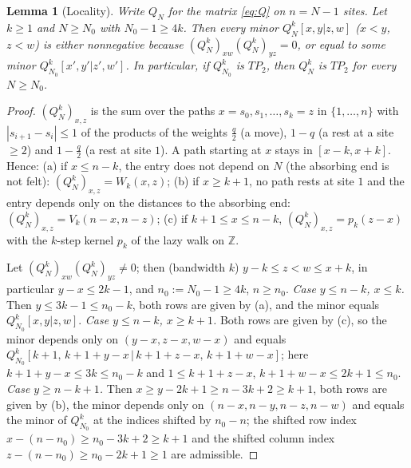 \documentclass[11pt,a4paper]{article}
\newtheorem{lemma}[theorem]{Lemma}
\theoremstyle{definition}
\theoremstyle{remark}
\newcommand{\Z}{\mathbb{Z}}
\begin{document}
\begin{lemma}[Locality]\label{lem:local}
Write $Q_N$ for the matrix \eqref{eq:Q} on $n=N-1$ sites. Let $k\ge1$ and $N\ge N_0$ with $N_0-1\ge4k$. Then every
minor $Q_N^k[x,y|z,w]$ ($x<y$, $z<w$) is either nonnegative because $(Q_N^k)_{xw}(Q_N^k)_{yz}=0$, or equal to some
minor $Q_{N_0}^k[x',y'|z',w']$. In particular, if $Q_{N_0}^k$ is $TP_2$, then $Q_N^k$ is $TP_2$ for every $N\ge N_0$.
\end{lemma}
\begin{proof}
$(Q_N^k)_{x,z}$ is the sum over the paths $x=s_0,s_1,\dots,s_k=z$ in $\{1,\dots,n\}$ with $|s_{i+1}-s_i|\le1$ of the
products of the weights $\frac q2$ (a move), $1-q$ (a rest at a site $\ge2$) and $1-\frac q2$ (a rest at site $1$).
A path starting at $x$ stays in $[x-k,x+k]$. Hence: (a) if $x\le n-k$, the entry does not depend on $N$ (the
absorbing end is not felt): $(Q_N^k)_{x,z}=W_k(x,z)$; (b) if $x\ge k+1$, no path rests at site $1$ and the entry
depends only on the distances to the absorbing end: $(Q_N^k)_{x,z}=V_k(n-x,n-z)$; (c) if $k+1\le x\le n-k$,
$(Q_N^k)_{x,z}=p_k(z-x)$ with the $k$-step kernel $p_k$ of the lazy walk on $\Z$.

Let $(Q_N^k)_{xw}(Q_N^k)_{yz}\ne0$; then (bandwidth $k$) $y-k\le z<w\le x+k$, in particular $y-x\le2k-1$, and
$n_0:=N_0-1\ge4k$, $n\ge n_0$.
\emph{Case $y\le n-k$, $x\le k$.} Then $y\le3k-1\le n_0-k$, both rows are given by (a), and the minor equals
$Q_{N_0}^k[x,y|z,w]$. \emph{Case $y\le n-k$, $x\ge k+1$.} Both rows are given by (c), so the minor depends only on
$(y-x,z-x,w-x)$ and equals $Q_{N_0}^k[k+1,\,k+1+y-x\,|\,k+1+z-x,\,k+1+w-x]$; here $k+1+y-x\le3k\le n_0-k$ and
$1\le k+1+z-x$, $k+1+w-x\le2k+1\le n_0$. \emph{Case $y\ge n-k+1$.} Then $x\ge y-2k+1\ge n-3k+2\ge k+1$, both rows are
given by (b), the minor depends only on $(n-x,n-y,n-z,n-w)$ and equals the minor of $Q_{N_0}^k$ at the indices shifted
by $n_0-n$; the shifted row index $x-(n-n_0)\ge n_0-3k+2\ge k+1$ and the shifted column index
$z-(n-n_0)\ge n_0-2k+1\ge1$ are admissible.
\end{proof}
\end{document}
